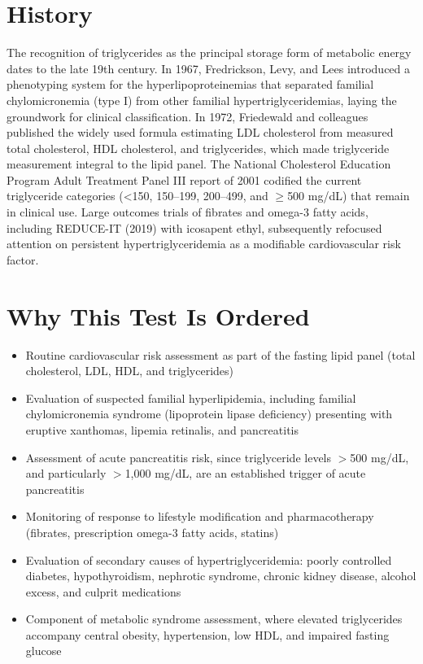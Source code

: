 \section*{History}
The recognition of triglycerides as the principal storage form of metabolic energy dates to the late 19th century. In 1967, Fredrickson, Levy, and Lees introduced a phenotyping system for the hyperlipoproteinemias that separated familial chylomicronemia (type I) from other familial hypertriglyceridemias, laying the groundwork for clinical classification. In 1972, Friedewald and colleagues published the widely used formula estimating LDL cholesterol from measured total cholesterol, HDL cholesterol, and triglycerides, which made triglyceride measurement integral to the lipid panel. The National Cholesterol Education Program Adult Treatment Panel III report of 2001 codified the current triglyceride categories (<150, 150--199, 200--499, and $\geq$500 mg/dL) that remain in clinical use. Large outcomes trials of fibrates and omega-3 fatty acids, including REDUCE-IT (2019) with icosapent ethyl, subsequently refocused attention on persistent hypertriglyceridemia as a modifiable cardiovascular risk factor.
\section*{Why This Test Is Ordered}
\begin{itemize}
  \item Routine cardiovascular risk assessment as part of the fasting lipid panel (total cholesterol, LDL, HDL, and triglycerides)
  \item Evaluation of suspected familial hyperlipidemia, including familial chylomicronemia syndrome (lipoprotein lipase deficiency) presenting with eruptive xanthomas, lipemia retinalis, and pancreatitis
  \item Assessment of acute pancreatitis risk, since triglyceride levels $>$500 mg/dL, and particularly $>$1,000 mg/dL, are an established trigger of acute pancreatitis
  \item Monitoring of response to lifestyle modification and pharmacotherapy (fibrates, prescription omega-3 fatty acids, statins)
  \item Evaluation of secondary causes of hypertriglyceridemia: poorly controlled diabetes, hypothyroidism, nephrotic syndrome, chronic kidney disease, alcohol excess, and culprit medications
  \item Component of metabolic syndrome assessment, where elevated triglycerides accompany central obesity, hypertension, low HDL, and impaired fasting glucose
\end{itemize}
